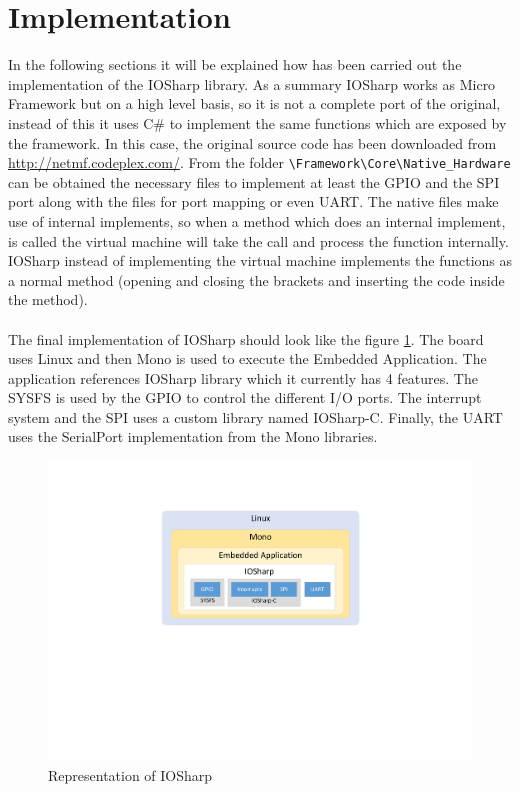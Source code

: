 \section{Implementation}\label{S:Implementation}
In the following sections it will be explained how has been carried out the implementation of the IOSharp library. As a summary IOSharp works as Micro Framework but on a high level basis, so it is not a complete port of the original, instead of this it uses C\# to implement the same functions which are exposed by the framework. In this case, the original source code has been downloaded from \url{http://netmf.codeplex.com/}. From the folder \verb!\Framework\Core\Native_Hardware! can be obtained the necessary files to implement at least the GPIO and the SPI port along with the files for port mapping or even UART. The native files make use of internal implements, so when a method which does an internal implement, is called the virtual machine will take the call and process the function internally. IOSharp instead of implementing the virtual machine implements the functions as a normal method (opening and closing the brackets and inserting the code inside the method).
\\
\\
The final implementation of IOSharp should look like the figure \ref{fig:iosharp-schema}. The board uses Linux and then Mono is used to execute the Embedded Application. The application references IOSharp library which it currently has 4 features. The SYSFS is used by the GPIO to control the different I/O ports. The interrupt system and the SPI uses a custom library named IOSharp-C. Finally, the UART uses the SerialPort implementation from the Mono libraries.
\begin{figure}[H]\begin{center}
 \centering
  \captionsetup{justification=centering}
  \includegraphics[scale=0.75]{pictures/iosharp/iosharp-schema2}
  \caption{Representation of IOSharp\label{fig:iosharp-schema}}
\end{center}\end{figure}

